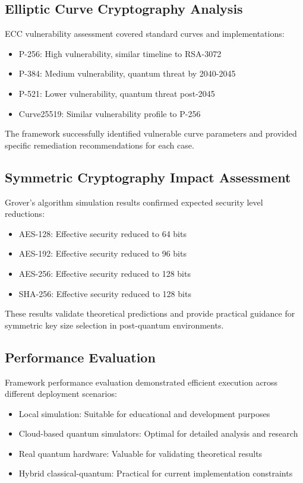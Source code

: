 \documentclass[11pt]{article}
\begin{document}
\subsection{Elliptic Curve Cryptography Analysis}

ECC vulnerability assessment covered standard curves and implementations:

\begin{itemize}
\item P-256: High vulnerability, similar timeline to RSA-3072
\item P-384: Medium vulnerability, quantum threat by 2040-2045
\item P-521: Lower vulnerability, quantum threat post-2045
\item Curve25519: Similar vulnerability profile to P-256
\end{itemize}

The framework successfully identified vulnerable curve parameters and provided specific remediation recommendations for each case.

\subsection{Symmetric Cryptography Impact Assessment}

Grover's algorithm simulation results confirmed expected security level reductions:

\begin{itemize}
\item AES-128: Effective security reduced to 64 bits
\item AES-192: Effective security reduced to 96 bits
\item AES-256: Effective security reduced to 128 bits
\item SHA-256: Effective security reduced to 128 bits
\end{itemize}

These results validate theoretical predictions and provide practical guidance for symmetric key size selection in post-quantum environments.

\subsection{Performance Evaluation}

Framework performance evaluation demonstrated efficient execution across different deployment scenarios:

\begin{itemize}
\item Local simulation: Suitable for educational and development purposes
\item Cloud-based quantum simulators: Optimal for detailed analysis and research
\item Real quantum hardware: Valuable for validating theoretical results
\item Hybrid classical-quantum: Practical for current implementation constraints
\end{itemize}
\end{document}
